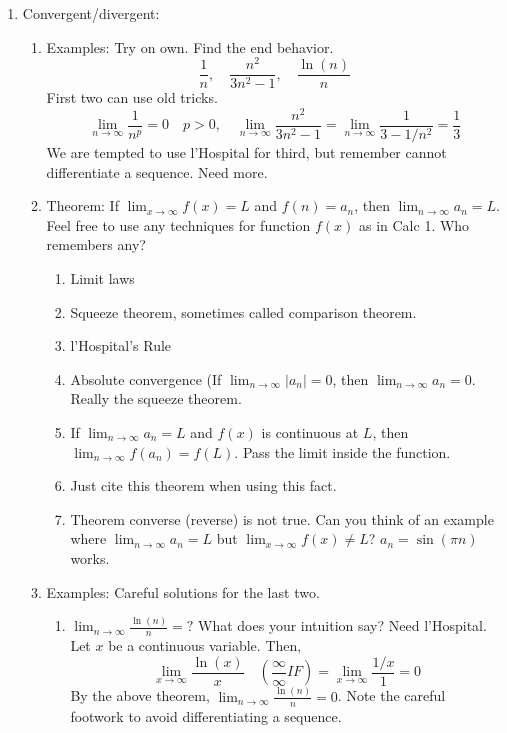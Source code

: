 \documentclass{article}
\newcommand{\ds}{\displaystyle}
\begin{document}
\begin{enumerate}
\item Convergent/divergent:
\begin{enumerate}

\item Examples: Try on own. Find the end behavior. 
\[
\frac{1}{n}, \quad \frac{n^2}{3n^2-1}, \quad \frac{\ln(n)}{n}
\]
First two can use old tricks.
\[
\lim_{n\rightarrow \infty} \frac{1}{n^p} = 0 \quad p>0, \quad \lim_{n\rightarrow \infty} \frac{n^2}{3n^2-1}=\lim_{n\rightarrow \infty} \frac{1}{3-1/n^2}=\frac{1}{3}
\]
We are tempted to use l'Hospital for third, but remember cannot differentiate a sequence. Need more.

\item Theorem: If $\ds \lim_{x\rightarrow \infty} f(x)=L$ and $f(n)=a_n$, then $\lim_{n\rightarrow \infty} a_n=L$. \\ 

Feel free to use any techniques for function $f(x)$ as in Calc 1. Who remembers any?
\begin{enumerate}
\item Limit laws
\item Squeeze theorem, sometimes called comparison theorem.
\item l'Hospital's Rule
\item Absolute convergence (If $\ds \lim_{n\rightarrow \infty} |a_n| = 0$, then $\ds \lim_{n\rightarrow \infty} a_n = 0$. Really the squeeze theorem.
\item If $\ds \lim_{n\rightarrow \infty} a_n = L$ and $f(x)$ is continuous at $L$, then $\ds \lim_{n\rightarrow \infty} f(a_n) = f(L)$. Pass the limit inside the function.
\item Just cite this theorem when using this fact. 
\item Theorem converse (reverse) is not true. Can you think of an example where $\ds \lim_{n\rightarrow \infty} a_n=L$ but $\ds \lim_{x\rightarrow \infty} f(x) \neq L$? $a_n=\sin(\pi n)$ works.
\end{enumerate}

\item Examples: Careful solutions for the last two.
\begin{enumerate}
\item $\ds \lim_{n\rightarrow \infty} \frac{\ln(n)}{n}=?$ What does your intuition say? Need l'Hospital. Let $x$ be a continuous variable. Then, 
\[
\lim_{x\rightarrow \infty} \frac{\ln(x)}{x} \quad \left( \frac{\infty}{\infty} IF \right) = \lim_{x\rightarrow \infty} \frac{1/x}{1} = 0
\]
By the above theorem, $\ds \lim_{n\rightarrow \infty} \frac{\ln(n)}{n}=0$. Note the careful footwork to avoid differentiating a sequence.
\end{enumerate}



\end{enumerate}
\end{enumerate}
\end{document}

